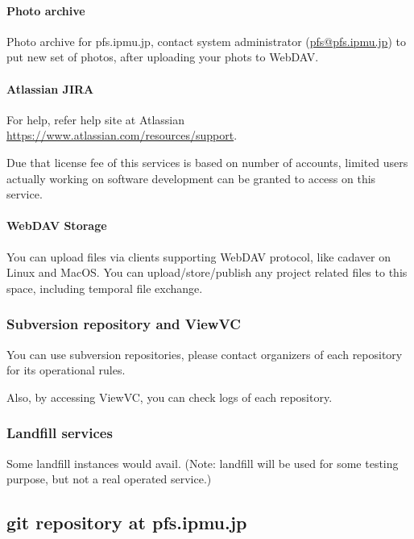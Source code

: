 \documentclass[a4paper,notitlepage]{article}
\begin{document}
\paragraph{Photo archive}

Photo archive for pfs.ipmu.jp, 
contact system administrator (\url{pfs@pfs.ipmu.jp}) to put new 
set of photos, after uploading your phots to WebDAV. 


\paragraph{Atlassian JIRA}
\label{sec:pfs-jira}

For help, refer help site at Atlassian 
\url{https://www.atlassian.com/resources/support}.

Due that license fee of this services is based on number of accounts, 
limited users actually working on software development can be granted to 
access on this service. 


\paragraph{WebDAV Storage}
\label{sec:pfs-webdav}

You can upload files via clients supporting WebDAV protocol, like cadaver on 
Linux and MacOS. 
You can upload/store/publish any project related files to this space, 
including temporal file exchange. 

\subsubsection{Subversion repository and ViewVC}

You can use subversion repositories, please contact organizers of each 
repository for its operational rules. 

Also, by accessing ViewVC, you can check logs of each repository. 

\subsubsection{Landfill services}

Some landfill instances would avail. 
(Note: landfill will be used for some testing purpose, but not a real 
operated service.) 


\subsection{git repository at pfs.ipmu.jp}
\label{sec:pfs-gitolite}
\end{document}
